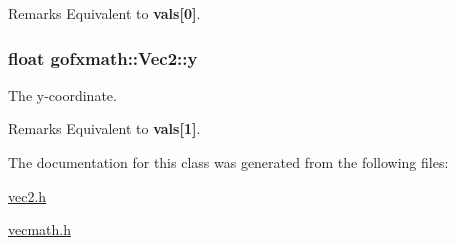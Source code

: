 \begin{DoxyRemark}{Remarks}
Equivalent to {\bfseries vals\mbox{[}0\mbox{]}}. 
\end{DoxyRemark}
\hypertarget{classgofxmath_1_1_vec2_ac182a240fd0c4d554b970a1247d796d5}{}
\subsubsection[{y}]{\setlength{\rightskip}{0pt plus 5cm}float gofxmath\+::\+Vec2\+::y}\label{classgofxmath_1_1_vec2_ac182a240fd0c4d554b970a1247d796d5}


The y-\/coordinate. 

\begin{DoxyRemark}{Remarks}
Equivalent to {\bfseries vals\mbox{[}1\mbox{]}}. 
\end{DoxyRemark}


The documentation for this class was generated from the following files\+:\begin{DoxyCompactItemize}
\item 
\hyperlink{vec2_8h}{vec2.\+h}\item 
\hyperlink{vecmath_8h}{vecmath.\+h}\end{DoxyCompactItemize}
